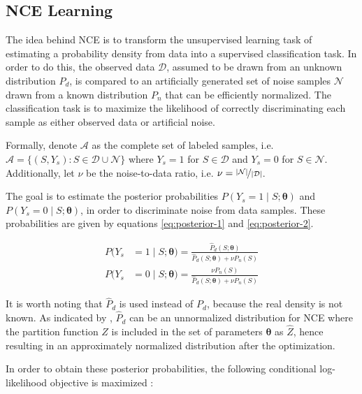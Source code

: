 \subsection{NCE Learning}

The idea behind NCE is to transform the unsupervised learning task of estimating a probability density from data into a supervised classification task. In order to do this, the observed data $\mathcal{D}$, assumed to be drawn from an unknown distribution $P_{d}$, is compared to an artificially generated set of noise samples $\mathcal{N}$ drawn from a known distribution $P_{n}$ that can be efficiently normalized. The classification task is to maximize the likelihood of correctly discriminating each sample as either observed data or artificial noise.

Formally, denote $\mathcal{A}$ as the complete set of labeled samples, i.e. $\mathcal{A} = \{(S,Y_{s}) : S \in \mathcal{D} \cup \mathcal{N}\}$ where $Y_{s} = 1$ for $S \in \mathcal{D}$ and $Y_{s} = 0$ for $S \in \mathcal{N}$. Additionally, let $\nu$ be the noise-to-data ratio, i.e. $\nu = \nicefrac{|\mathcal{N}|}{|\mathcal{D}|}$.

The goal is to estimate the posterior probabilities $P(Y_{s} = 1 \mid S;\boldsymbol{\theta})$ and $P(Y_{s} = 0 \mid S;\boldsymbol{\theta})$, in order to discriminate noise from data samples. These probabilities are given by equations \eqref{eq:posterior-1} and \eqref{eq:posterior-2}.

\begin{align}
  P(Y_{s} &= 1 \mid S;\boldsymbol{\theta}) = \frac{\hat{P}_{d}(S;\boldsymbol{\theta})}{\hat{P}_{d}(S;\boldsymbol{\theta}) + \nu P_{n}(S)}
  \label{eq:posterior-1} \\
  P(Y_{s} &= 0 \mid S;\boldsymbol{\theta}) = \frac{\nu P_{n}(S)}{\hat{P}_{d}(S;\boldsymbol{\theta}) + \nu P_{n}(S)}
  \label{eq:posterior-2}
\end{align}

It is worth noting that $\hat{P}_{d}$ is used instead of $P_{d}$, because the real density is not known. As indicated by \citet{Gutmann12NCE}, $\hat{P}_{d}$ can be an unnormalized distribution for NCE where the partition function $Z$ is included in the set of parameters $\boldsymbol{\theta}$ as $\hat{Z}$, hence resulting in an approximately normalized distribution after the optimization.

In order to obtain these posterior probabilities, the following conditional log-likelihood objective is maximized \citep{Gutmann12NCE}:

